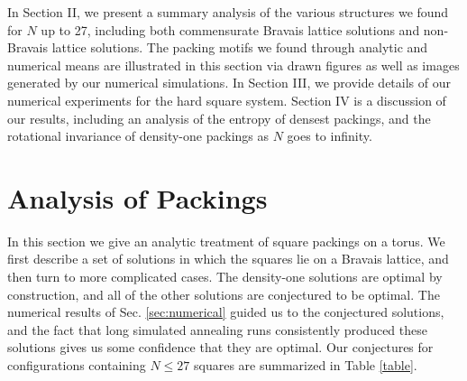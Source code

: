 \documentclass[preprint,aps]{revtex4}
\begin{document}
In Section II, we present a summary analysis of the various structures we found for $N$ up to 27, including both commensurate Bravais lattice solutions and non-Bravais lattice solutions.  The packing motifs we found through analytic and numerical means are illustrated in this section via drawn figures as well as images generated by our numerical simulations. In Section III, we provide details of our numerical experiments for the hard square system. Section IV is a discussion of our results, including an analysis of the entropy of densest packings, and the rotational invariance of density-one packings as $N$ goes to infinity. 


%

\section{Analysis of Packings}
\label{sec:analytics}

In this section we give an analytic treatment of square packings on a torus.  We first describe a set of solutions in which the squares lie on a Bravais lattice, and then turn to more complicated cases. The density-one solutions are optimal by construction, and all of the other solutions are conjectured to be optimal. The numerical results of Sec. \ref{sec:numerical} guided us to the conjectured solutions, and the fact that long simulated annealing runs consistently produced these solutions gives us some confidence that they are optimal.  Our conjectures for configurations containing $N \leq 27$ squares are summarized in Table \ref{table}.
\end{document}
